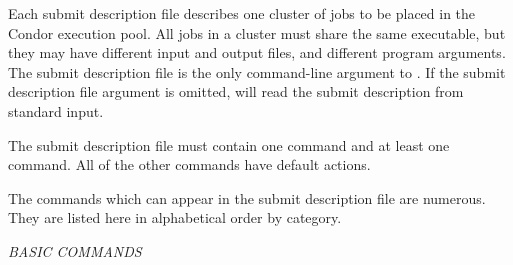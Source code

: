Each submit description file describes one cluster of jobs to be
placed in the Condor execution pool. All jobs in a cluster must share
the same executable, but they may have different input and output files,
and different program arguments. The submit description file is
the only command-line argument to . If the submit description
file argument is omitted,  will read the submit description
from standard input.

The submit description file must contain 
one  command and at least one  command.
All of the other commands have default actions.

The commands which can appear in the submit description file are
numerous.  They are listed here in alphabetical order by category.

\emph{BASIC COMMANDS}
